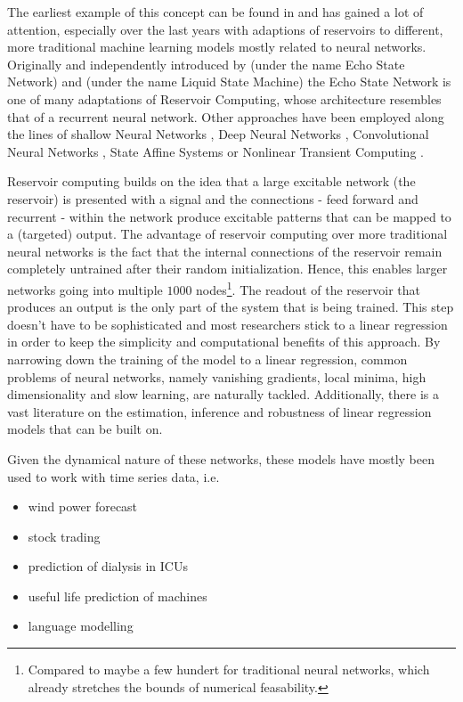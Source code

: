The earliest example of this concept can be found in \cite{Buonomano1995TemporalIT} and has gained a lot of attention, especially over the last years with adaptions of reservoirs to different, more traditional machine learning models mostly related to neural networks.
Originally and independently introduced by \cite{Jaeger2003, Jaeger2004Harness} (under the name Echo State Network) and \cite{Maass2002LSM} (under the name Liquid State Machine) the Echo State Network is one of many adaptations of Reservoir Computing, whose architecture resembles that of a recurrent neural network. Other approaches have been employed along the lines of shallow Neural Networks \citep{Huang2006ELM}, Deep Neural Networks \citep{Gallichio2017DeepRCSurvey, Gallichio2017DeepRC}, Convolutional Neural Networks \citep{MaChenLi2019ConvESN}, State Affine Systems \citep{Grigortega2018SAS} or Nonlinear Transient Computing \citep{Crook2007NonLinTrans}.

Reservoir computing builds on the idea that a large excitable network (the reservoir) is presented with a signal and the connections - feed forward and recurrent - within the network produce excitable patterns that can be mapped to a (targeted) output. The advantage of reservoir computing over more traditional neural networks is the fact that the internal connections of the reservoir remain completely untrained after their random initialization. Hence, this enables larger networks going into multiple $1000$ nodes\footnote{Compared to maybe a few hundert for traditional neural networks, which already stretches the bounds of numerical feasability.}. The readout of the reservoir that produces an output is the only part of the system that is being trained. This step doesn't have to be sophisticated and most researchers stick to a linear regression in order to keep the simplicity and computational benefits of this approach.
By narrowing down the training of the model to a linear regression, common problems of neural networks, namely vanishing gradients, local minima, high dimensionality and slow learning, are naturally tackled. Additionally, there is a vast literature on the estimation, inference and robustness of linear regression models that can be built on.

Given the dynamical nature of these networks, these models have mostly been used to work with time series data, i.e. 
\begin{itemize}
    \item wind power forecast \citep{Xiaomin2015WindPower}
    \item stock trading \citep{Lin2011StockTrading}
    \item prediction of dialysis in ICUs \citep{Verplancke2010Dialysis} 
    \item useful life prediction of machines \citep{Rigamoti2018UsefulLife}
    \item language modelling \citep{Rachez2014LanguageModelling}
\end{itemize}

